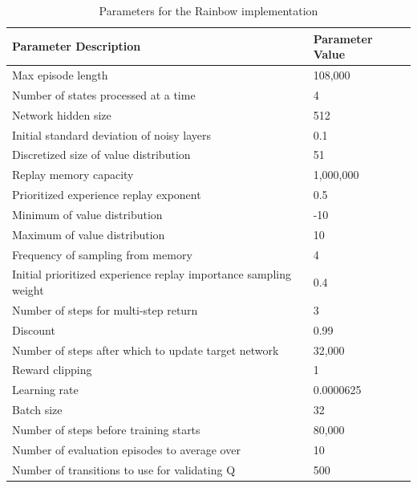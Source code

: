 \documentclass{article}
\begin{document}
\begin{table}
  \caption{Parameters for the Rainbow implementation}
  \label{tab:paramRAIN}
  \centering
  \begin{tabular}{ll}
    \toprule
    Parameter Description & Parameter Value\\
    \midrule
    Max episode length & 108,000\\
    Number of states processed at a time & 4\\
    Network hidden size & 512\\
    Initial standard deviation of noisy layers & 0.1\\
    Discretized size of value distribution & 51\\
    Replay memory capacity & 1,000,000\\
    Prioritized experience replay exponent & 0.5\\
    Minimum of value distribution & -10\\
    Maximum of value distribution & 10\\
    Frequency of sampling from memory & 4\\
    Initial prioritized experience replay importance sampling weight & 0.4\\
    Number of steps for multi-step return & 3\\
    Discount & 0.99\\
    Number of steps after which to update target network & 32,000 \\
    Reward clipping & 1\\
    Learning rate & 0.0000625\\
    Batch size & 32\\
    Number of steps before training starts & 80,000\\
    Number of evaluation episodes to average over & 10 \\
    Number of transitions to use for validating Q & 500 \\
    \bottomrule
  \end{tabular}
\end{table}
\end{document}
